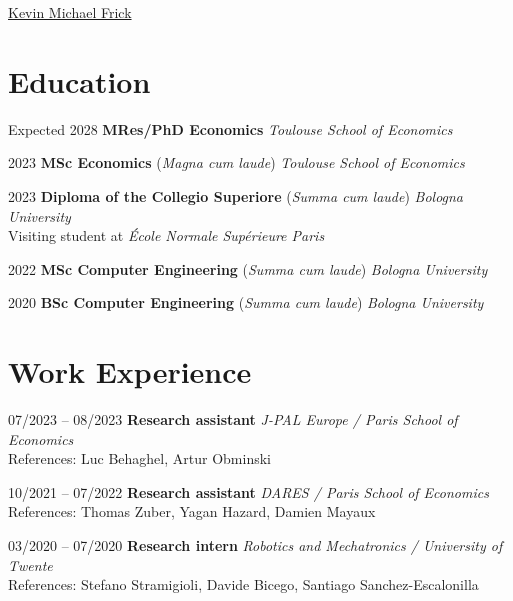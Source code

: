 \documentclass[11pt,a4paper]{article}
\newcommand{\longunderline}[1]{\uline{#1\hfill\mbox{}}}
\begin{document}
\date{}
\thispagestyle{empty}
\setlength\cvlabelwidth{90pt}

\begin{cv}
{\huge \longunderline{Kevin Michael Frick}}
\section*{Education}
\begin{cvlist}{}
  \itemsep -5pt

	\item[Expected 2028]
		\textbf{MRes/PhD Economics} \hfill \textit{Toulouse School of Economics}  \item[2023]
    \textbf{MSc Economics} (\emph{Magna cum laude}) \hfill \textit{Toulouse School of Economics}  \item[2023]
    \textbf{Diploma of the Collegio Superiore} (\emph{Summa cum laude}) \hfill \textit{Bologna University}  \\ Visiting student at \textit{École Normale Supérieure Paris}  \item[2022]
    \textbf{MSc Computer Engineering} (\emph{Summa cum laude}) \hfill \textit{Bologna University}  \item[2020]
    \textbf{BSc Computer Engineering} (\emph{Summa cum laude}) \hfill \textit{Bologna University}\end{cvlist}

\section*{Work Experience}
\begin{cvlist}{}
  \itemsep -5pt
	\item[07/2023 -- 08/2023]
		\textbf{Research assistant} \hfill \textit{J-PAL Europe / Paris School of Economics} \\
		References: Luc Behaghel, Artur Obminski
	\item[10/2021 -- 07/2022]
    \textbf{Research assistant} \hfill \textit{DARES / Paris School of Economics} \\
		References: Thomas Zuber, Yagan Hazard, Damien Mayaux
	\item[03/2020 -- 07/2020]
		\textbf{Research intern} \hfill \textit{Robotics and Mechatronics / University of Twente} \\
		References: Stefano Stramigioli, Davide Bicego, Santiago Sanchez-Escalonilla
\end{cvlist}


\end{cv}
\end{document}
